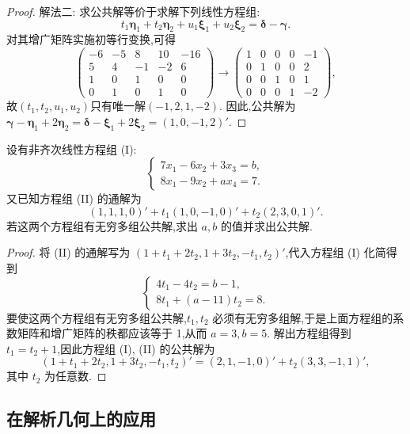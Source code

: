 \documentclass[../../main.tex]{subfiles}%
\begin{document}
\begin{proof}
{\color{blue}解法二:} 求公共解等价于求解下列线性方程组:
\[
t_1\boldsymbol{\eta}_1 + t_2\boldsymbol{\eta}_2 + u_1\boldsymbol{\xi}_1 + u_2\boldsymbol{\xi}_2=\boldsymbol{\delta}-\boldsymbol{\gamma}.
\]
对其增广矩阵实施初等行变换,可得
\[
\begin{pmatrix}
-6&-5&8&10&-16\\
5&4&-1&-2&6\\
1&0&1&0&0\\
0&1&0&1&0
\end{pmatrix}\to\begin{pmatrix}
1&0&0&0&-1\\
0&1&0&0&2\\
0&0&1&0&1\\
0&0&0&1&-2
\end{pmatrix},
\]
故\((t_1,t_2,u_1,u_2)\)只有唯一解\((-1,2,1,-2)\). 因此,公共解为\(\boldsymbol{\gamma}-\boldsymbol{\eta}_1 + 2\boldsymbol{\eta}_2=\boldsymbol{\delta}-\boldsymbol{\xi}_1 + 2\boldsymbol{\xi}_2=(1,0,-1,2)'\).
\end{proof}

\begin{example}
设有非齐次线性方程组 (I):
\[
\begin{cases}
7x_1 - 6x_2 + 3x_3 = b,\\
8x_1 - 9x_2 + ax_4 = 7.
\end{cases}
\]
又已知方程组 (II) 的通解为
\[
(1,1,1,0)' + t_1(1,0,-1,0)' + t_2(2,3,0,1)'.
\]
若这两个方程组有无穷多组公共解,求出 \(a,b\) 的值并求出公共解.
\end{example}
\begin{proof}
将 (II) 的通解写为 \((1 + t_1 + 2t_2,1 + 3t_2,-t_1,t_2)'\),代入方程组 (I) 化简得到
\[
\begin{cases}
4t_1 - 4t_2 = b - 1,\\
8t_1 + (a - 11)t_2 = 8.
\end{cases}
\]
要使这两个方程组有无穷多组公共解,\(t_1,t_2\) 必须有无穷多组解,于是上面方程组的系数矩阵和增广矩阵的秩都应该等于 1,从而 \(a = 3,b = 5\). 解出方程组得到 \(t_1 = t_2 + 1\),因此方程组 (I), (II) 的公共解为
\[
(1 + t_1 + 2t_2,1 + 3t_2,-t_1,t_2)' = (2,1,-1,0)' + t_2(3,3,-1,1)',
\]
其中 \(t_2\) 为任意数.
\end{proof}

\subsection{在解析几何上的应用}
\end{document}
